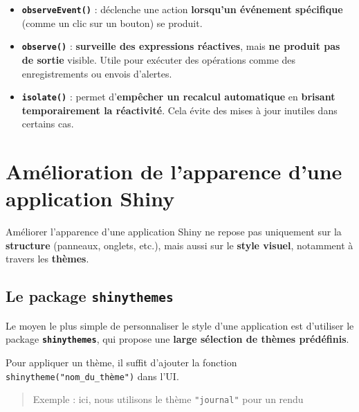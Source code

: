 \documentclass[
]{article}
\providecommand{\tightlist}{%
  \setlength{\itemsep}{0pt}\setlength{\parskip}{0pt}}
\begin{document}
\begin{itemize}
\tightlist
\item
  \textbf{\texttt{observeEvent()}} : déclenche une action
  \textbf{lorsqu'un événement spécifique} (comme un clic sur un bouton)
  se produit.\\
\item
  \textbf{\texttt{observe()}} : \textbf{surveille des expressions
  réactives}, mais \textbf{ne produit pas de sortie} visible. Utile pour
  exécuter des opérations comme des enregistrements ou envois
  d'alertes.\\
\item
  \textbf{\texttt{isolate()}} : permet d'\textbf{empêcher un recalcul
  automatique} en \textbf{brisant temporairement la réactivité}. Cela
  évite des mises à jour inutiles dans certains cas.
\end{itemize}

\newpage

\section{Amélioration de l'apparence d'une application
Shiny}\label{amuxe9lioration-de-lapparence-dune-application-shiny}

Améliorer l'apparence d'une application Shiny ne repose pas uniquement
sur la \textbf{structure} (panneaux, onglets, etc.), mais aussi sur le
\textbf{style visuel}, notamment à travers les \textbf{thèmes}.

\subsection{\texorpdfstring{Le package
\texttt{shinythemes}}{Le package shinythemes}}\label{le-package-shinythemes}

Le moyen le plus simple de personnaliser le style d'une application est
d'utiliser le package \textbf{\texttt{shinythemes}}, qui propose une
\textbf{large sélection de thèmes prédéfinis}.

Pour appliquer un thème, il suffit d'ajouter la fonction
\texttt{shinytheme("nom\_du\_thème")} dans l'UI.

\begin{quote}
Exemple : ici, nous utilisons le thème \texttt{"journal"} pour un rendu
\end{quote}
\end{document}
